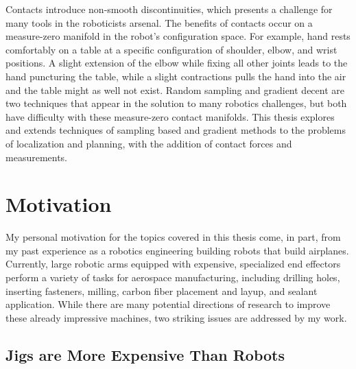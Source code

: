 \documentclass[../thesis.tex]{subfiles}
\begin{document}
Contacts introduce non-smooth discontinuities, which presents a challenge for many tools in the roboticists arsenal.
The benefits of contacts occur on a measure-zero manifold in the robot's configuration space.
For example, hand rests comfortably on a table at a specific configuration of shoulder, elbow, and wrist positions.
A slight extension of the elbow while fixing all other joints leads to the hand puncturing the table, while a slight contractions pulls the hand into the air and the table might as well not exist.
Random sampling and gradient decent are two techniques that appear in the solution to many robotics challenges, but both have difficulty with these measure-zero contact manifolds.
This thesis explores and extends techniques of sampling based and gradient methods to the problems of localization and planning, with the addition of contact forces and measurements.




\section{Motivation}
My personal motivation for the topics covered in this thesis come, in part, from my past experience as a robotics engineering building robots that build airplanes.
Currently, large robotic arms equipped with expensive, specialized end effectors perform a variety of tasks for aerospace manufacturing, including drilling holes, inserting fasteners, milling, carbon fiber placement and layup, and sealant application.
While there are many potential directions of research to improve these already impressive machines, two striking issues are addressed by my work.

\subsection{Jigs are More Expensive Than Robots}
\end{document}
